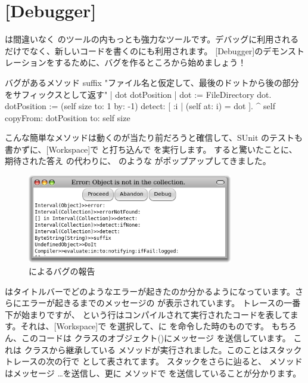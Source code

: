 \documentclass[a4paper,10pt,twoside]{book}
\begin{document}
\section{[Debugger]}

\ind{[Debugger]} は間違いなく \pharo のツールの内もっとも強力なツールです。デバッグに利用されるだけでなく、新しいコードを書くのにも利用されます。
[Debugger]のデモンストレーションをするために、バグを作るところから始めましょう！


\begin{method}[buggy]{バグがあるメソッド}
suffix
	"ファイル名と仮定して、最後のドットから後の部分をサフィックスとして返す"
	| dot dotPosition |
	dot := FileDirectory dot.
	dotPosition := (self size to: 1 by: -1) detect: [ :i | (self at: i) = dot ].
	^ self copyFrom: dotPosition to: self size 
\end{method}

こんな簡単なメソッドは動くのが当たり前だろうと確信して、SUnit のテストも書かずに、[Workspace]で  と打ち込んで  を実行します。
すると驚いたことに、期待された答え  の代わりに、  のような  がポップアップしてきました。

\begin{figure}[btp]
	\begin{center}
	\includegraphics[width=0.8\textwidth]{PreDebugWindow}
	\end{center}
	\caption{  によるバグの報告}
\end{figure}

 はタイトルバーでどのようなエラーが起きたのか分かるようになっています。さらにエラーが起きるまでのメッセージの  が表示されています。
トレースの一番下が始まりですが、  という行はコンパイルされて実行されたコードを表してます。それは、[Workspace]で  を選択して、\pharo に  を命令した時のものです。
もちろん、このコードは  クラスのオブジェクト()にメッセージ  を送信しています。
これは  クラスから継承している  メソッドが実行されました。このことはスタックトレースの次の行で  として表されてます。
スタックをさらに辿ると、 メソッドはメッセージ \ldots を送信し、更に  メソッドで  を送信していることが分かります。
\end{document}

